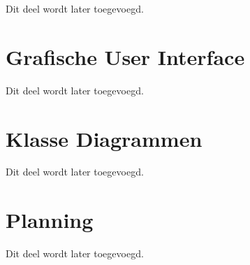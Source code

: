 \documentclass[12pt,a4paper]{report}
\begin{document}
Dit deel wordt later toegevoegd.

\chapter{Grafische User Interface}

Dit deel wordt later toegevoegd.

\chapter{Klasse Diagrammen}

Dit deel wordt later toegevoegd.

\chapter{Planning}
\label{appendix:planning}

Dit deel wordt later toegevoegd.

\end{document}

